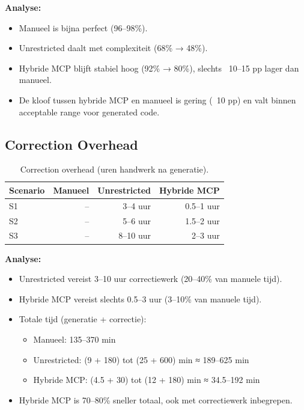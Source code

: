 \noindent
\textbf{Analyse:}
\begin{itemize}
  \item Manueel is bijna perfect (96--98\%).
  \item Unrestricted daalt met complexiteit (68\% → 48\%).
  \item Hybride MCP blijft stabiel hoog (92\% → 80\%), slechts ~10--15 pp lager dan manueel.
  \item De kloof tussen hybride MCP en manueel is gering (~10 pp) en valt binnen acceptable range voor generated code.
\end{itemize}

\subsection{Correction Overhead}

\begin{table}[h]
\small
\begin{tabularx}{\textwidth}{|l|r|r|r|}
\hline
\textbf{Scenario} & \textbf{Manueel} & \textbf{Unrestricted} & \textbf{Hybride MCP} \\
\hline
S1 & -- & 3--4 uur & 0.5--1 uur \\
S2 & -- & 5--6 uur & 1.5--2 uur \\
S3 & -- & 8--10 uur & 2--3 uur \\
\hline
\end{tabularx}
\caption{Correction overhead (uren handwerk na generatie).}
\label{tab:overhead-comparison}
\end{table}

\noindent
\textbf{Analyse:}
\begin{itemize}
  \item Unrestricted vereist 3--10 uur correctiewerk (20--40\% van manuele tijd).
  \item Hybride MCP vereist slechts 0.5--3 uur (3--10\% van manuele tijd).
  \item Totale tijd (generatie + correctie):
    \begin{itemize}
      \item Manueel: 135--370 min
      \item Unrestricted: (9 + 180) tot (25 + 600) min ≈ 189--625 min
      \item Hybride MCP: (4.5 + 30) tot (12 + 180) min ≈ 34.5--192 min
    \end{itemize}
  \item Hybride MCP is 70--80\% sneller totaal, ook met correctiewerk inbegrepen.
\end{itemize}

